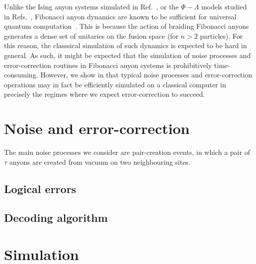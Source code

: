 \documentclass[aps, prl, letterpaper, twocolumn, superscriptaddress, notitlepage]{revtex4-1}
\begin{document}
	Unlike the Ising anyon systems simulated in Ref.~\cite{Brell2013}, or the $\Phi-\Lambda$ models studied in Refs.~\cite{Wootton2013, Hutter2014}, Fibonacci anyon dynamics are known to be sufficient for universal quantum computation~\cite{Freedman2002}. This is because the action of braiding Fibonacci anyons generates a dense set of unitaries on the fusion space (for $n>2$ particles). For this reason, the classsical simulation of such dynamics is expected to be hard in general. As such, it might be expected that the simulation of noise processes and error-correction routines in Fibonacci anyon systems is prohibitively time-consuming. However, we show in  that typical noise processes and error-correction operations may in fact be efficiently simulated on a classical computer in precisely the regimes where we expect error-correction to succeed.
	


\section{Noise and error-correction}\label{s:noise}

	The main noise processes we consider are pair-creation events, in which a pair of $\tau$ anyons are created from vacuum on two neighbouring sites.
	

	\subsection{Logical errors}
		

	\subsection{Decoding algorithm}
	

	
	
\section{Simulation}\label{s:sim}
\end{document}
